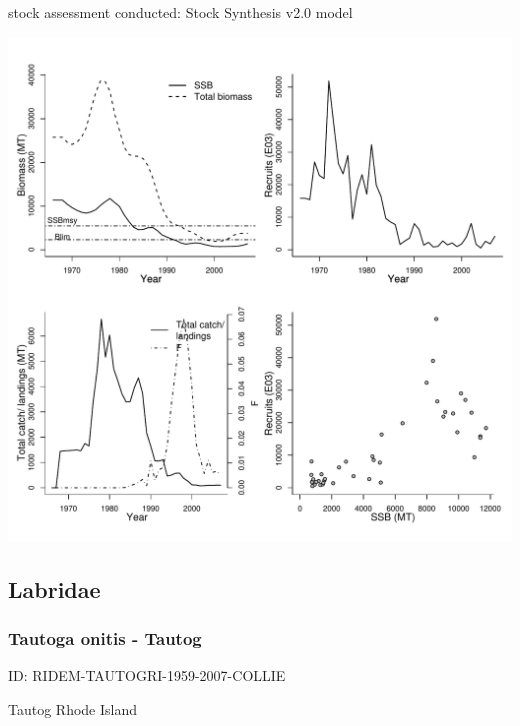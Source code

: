 stock assessment conducted: Stock Synthesis v2.0 model 
\begin{center}
\vspace{-0.2cm}\includegraphics[scale=0.65]{../tex/figures/plot-CSIRO-GEMFISHSESSF-1966-2007-FULTON.pdf}
\end{center}

\newpage
\subsection{Labridae}

\subsubsection{Tautoga onitis - Tautog}
ID: RIDEM-TAUTOGRI-1959-2007-COLLIE

Tautog Rhode Island 


